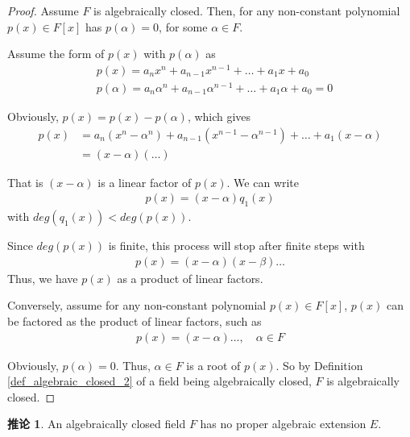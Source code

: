 \documentclass[utf8]{ctexbook}
\theoremstyle{definition}
\newtheorem{corollary}{推论}[section]
\begin{document}
\begin{proof}
Assume $F$ is algebraically closed. Then, for any non-constant polynomial $p(x) \in F[x]$ has $p(\alpha) = 0$, for some $\alpha \in F$.

Assume the form of $p(x)$ with $p(\alpha)$ as
\begin{align*}
& p(x) = a_n x^n + a_{n-1} x^{n-1} + \ldots + a_1 x + a_0 \\
& p(\alpha) = a_n \alpha^n + a_{n-1} \alpha^{n-1} + \ldots + a_1 \alpha + a_0 = 0
\end{align*}

Obviously, $p(x) = p(x) - p(\alpha)$, which gives
\begin{align*}
p(x) &= a_n (x^n - \alpha^n) + a_{n-1} (x^{n-1} - \alpha^{n-1} ) + \ldots + a_1 (x - \alpha) \\
&=(x-\alpha) (\ldots )
\end{align*}

That is $(x-\alpha)$ is a linear factor of $p(x)$. We can write
\begin{align*}
p(x) = (x-\alpha)q_1(x)
\end{align*}
with $deg(q_1(x)) < deg(p(x))$.

Since $deg(p(x))$ is finite, this process will stop after finite steps with
\begin{align*}
p(x) = (x-\alpha) (x - \beta) \ldots
\end{align*}
Thus, we have $p(x)$ as a product of linear factors.

Conversely, assume for any non-constant polynomial $p(x) \in F[x]$, $p(x)$ can be factored as the product of linear factors, such as
\begin{align*}
p(x) = (x-\alpha) \ldots, \quad \alpha \in F
\end{align*}

Obviously, $p(\alpha)=0$. Thus, $\alpha \in F$ is a root of $p(x)$. So by Definition \ref{def_algebraic_closed_2} of a field being algebraically closed, $F$ is algebraically closed.


\end{proof}


\begin{corollary}
\label{corollary_4_4_1_alge_closed_field_no_proper_extension}
An algebraically closed field $F$ has no proper algebraic extension $E$.
\end{corollary}
\end{document}
